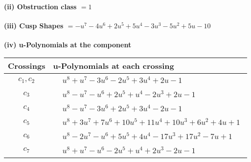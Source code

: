 \documentclass[1p]{elsarticle_modified}
\theoremstyle{definition}
\begin{document}
\flushleft \textbf{(ii) Obstruction class $= 1$}\\~\\
\flushleft \textbf{(iii) Cusp Shapes $= - u^7-4 u^6+2 u^5+5 u^4-3 u^3-5 u^2+5 u-10$}\\~\\
\newpage\renewcommand{\arraystretch}{1}
\flushleft \textbf{(iv) u-Polynomials at the component}\newline \\
\begin{tabular}{m{50pt}|m{274pt}}
Crossings & \hspace{64pt}u-Polynomials at each crossing \\
\hline $$\begin{aligned}c_{1},c_{2}\end{aligned}$$&$\begin{aligned}
&u^8+u^7-3 u^6-2 u^5+3 u^4+2 u-1
\end{aligned}$\\
\hline $$\begin{aligned}c_{3}\end{aligned}$$&$\begin{aligned}
&u^8- u^7- u^6+2 u^5+u^4-2 u^3+2 u-1
\end{aligned}$\\
\hline $$\begin{aligned}c_{4}\end{aligned}$$&$\begin{aligned}
&u^8- u^7-3 u^6+2 u^5+3 u^4-2 u-1
\end{aligned}$\\
\hline $$\begin{aligned}c_{5}\end{aligned}$$&$\begin{aligned}
&u^8+3 u^7+7 u^6+10 u^5+11 u^4+10 u^3+6 u^2+4 u+1
\end{aligned}$\\
\hline $$\begin{aligned}c_{6}\end{aligned}$$&$\begin{aligned}
&u^8-2 u^7- u^6+5 u^5+4 u^4-17 u^3+17 u^2-7 u+1
\end{aligned}$\\
\hline $$\begin{aligned}c_{7}\end{aligned}$$&$\begin{aligned}
&u^8+u^7- u^6-2 u^5+u^4+2 u^3-2 u-1
\end{aligned}$\\

\end{tabular}
\end{document}

